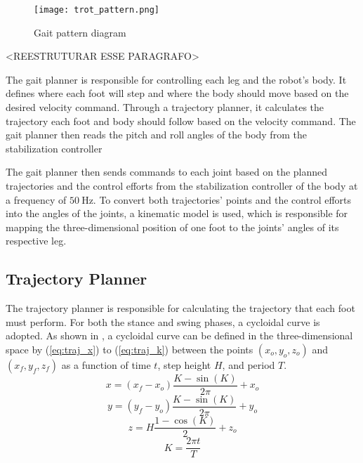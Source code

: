 \documentclass[conference]{IEEEtran}
\begin{document}
\begin{figure}[!htb]
  \centering
  \caption{Gait pattern diagram}
  \texttt{[image: trot\_pattern.png]}
  \vfill
  \label{fig:trot_pattern}
\end{figure}

<REESTRUTURAR ESSE PARAGRAFO>

The gait planner is responsible for controlling each leg and the robot's body. It defines where each foot will step and where the body should move based on the desired velocity command. Through a trajectory planner, it calculates the trajectory each foot and body should follow based on the velocity command. The gait planner then reads the pitch and roll angles of the body from the stabilization controller 

The gait planner then sends commands to each joint based on the planned trajectories and the control efforts from the stabilization controller of the body at a frequency of $\SI{50}{\hertz}$. To convert both trajectories' points and the control efforts into the angles of the joints, a kinematic model is used, which is responsible for mapping the three-dimensional position of one foot to the joints' angles of its respective leg.

\subsection{Trajectory Planner}

The trajectory planner is responsible for calculating the trajectory that each foot must perform. For both the stance and swing phases, a cycloidal curve is adopted. As shown in \cite{Shi2021}, a cycloidal curve can be defined in the three-dimensional space by (\ref{eq:traj_x}) to (\ref{eq:traj_k})
between the points $(x_o, y_o, z_o)$ and $(x_f, y_f, z_f)$ as a function of time $t$, step height $H$, and period $T$.
\begin{equation}
  x = (x_f - x_o) \frac{K - \sin{(K)}}{2 \pi} + x_o
  \label{eq:traj_x}
\end{equation}
\begin{equation}
  y = (y_f - y_o) \frac{K - \sin{(K)}}{2 \pi} + y_o
  \label{eq:traj_y}
\end{equation}
\begin{equation}
  z = H \frac{1 - \cos{(K)}}{2} + z_o
  \label{eq:traj_z}
\end{equation}
\begin{equation}
  K = \frac{2 \pi t}{T}
  \label{eq:traj_k}
\end{equation}
\end{document}

